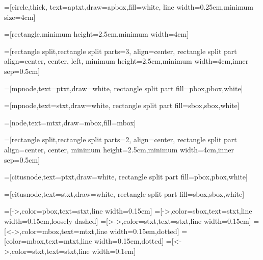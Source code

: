




=[circle,thick,
	text=aptxt,draw=apbox,fill=white,
	line width=0.25em,minimum size=4cm]

=[rectangle,minimum height=2.5cm,minimum width=4cm]

=[rectangle split,rectangle split parts=3,
	align=center,
	rectangle split part align={center, center, left},
	minimum height=2.5cm,minimum width=4cm,inner sep=0.5cm]

=[mpnode,text=ptxt,draw=white,
  	rectangle split part fill={pbox,pbox,white}]

=[mpnode,text=stxt,draw=white,
	rectangle split part fill={sbox,sbox,white}]

=[node,text=mtxt,draw=mbox,fill=mbox]

=[rectangle split,rectangle split parts=2,
	align=center,
	rectangle split part align={center, center},
	minimum height=2.5cm,minimum width=4cm,inner sep=0.5cm]

=[citusnode,text=ptxt,draw=white,
  	rectangle split part fill={pbox,pbox,white}]

=[citusnode,text=stxt,draw=white,
	rectangle split part fill={sbox,sbox,white}]

=[->,color=pbox,text=stxt,line width=0.15em]
=[->,color=sbox,text=stxt,line width=0.15em,loosely dashed]
=[>->,color=stxt,text=stxt,line width=0.15em]
=[<->,color=mbox,text=mtxt,line width=0.15em,dotted]
=[color=mbox,text=mtxt,line width=0.15em,dotted]
=[<->,color=stxt,text=stxt,line width=0.1em]

